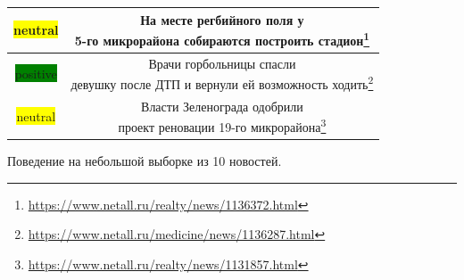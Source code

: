 \documentclass[12pt]{article}
\begin{document}
\begin{center}
\begin{tabular}{|c|c|}
                \hline
                \colorbox{yellow}{neutral} & \makecell{На месте регбийного поля у \\ 5-го микрорайона собираются построить стадион\footnote{\href{https://www.netall.ru/realty/news/1136372.html}{https://www.netall.ru/realty/news/1136372.html}}}\\
                \hline
                \colorbox{green}{positive} & \makecell{Врачи горбольницы спасли \\ девушку после ДТП и вернули ей возможность ходить\footnote{\href{https://www.netall.ru/medicine/news/1136287.html}{https://www.netall.ru/medicine/news/1136287.html}}}\\
                \hline
                \colorbox{yellow}{neutral} & \makecell{Власти Зеленограда одобрили \\ проект реновации 19-го микрорайона\footnote{\href{https://www.netall.ru/realty/news/1131857.html}{https://www.netall.ru/realty/news/1131857.html}}}\\
                \hline
                \end{tabular}
            \end{center}

            Поведение на небольшой выборке из 10 новостей.
\end{document}
